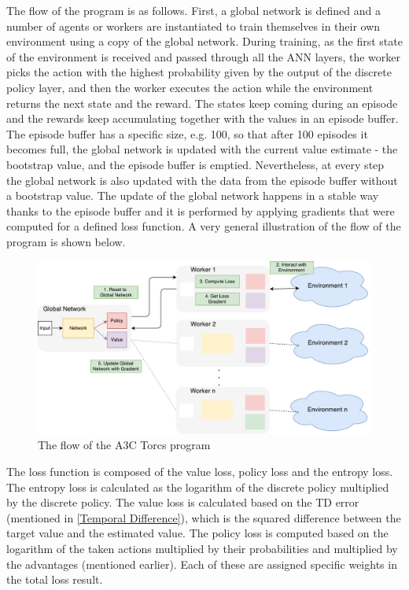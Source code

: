 The flow of the program is as follows. First, a global network is defined and a number of agents or workers are instantiated to train themselves in their own environment using a copy of the global network. During training, as the first state of the environment is received and passed through all the ANN layers, the worker picks the action with the highest probability given by the output of the discrete policy layer, and then the worker executes the action while the environment returns the next state and the reward. The states keep coming during an episode and the rewards keep accumulating together with the values in an episode buffer. The episode buffer has a specific size, e.g. 100, so that after 100 episodes it becomes full, the global network is updated with the current value estimate - the bootstrap value, and the episode buffer is emptied. Nevertheless, at every step the global network is also updated with the data from the episode buffer without a bootstrap value. The update of the global network happens in a stable way thanks to the episode buffer and it is performed by applying gradients that were computed for a defined loss function. A very general illustration of the flow of the program is shown below.
\begin{figure}[H]
	\centering
	\includegraphics[width=1.25\textwidth]{Figures/Flow}
	\caption{The flow of the A3C Torcs program}
	\label{Flow}
\end{figure}
The loss function is composed of the value loss, policy loss and the entropy loss. The entropy loss is calculated as the logarithm of the discrete policy multiplied by the discrete policy. The value loss is calculated based on the TD error (mentioned in \ref{Temporal Difference}), which is the squared difference between the target value and the estimated value. The policy loss is computed based on the logarithm of the taken actions multiplied by their probabilities and multiplied by the advantages (mentioned earlier). Each of these are assigned specific weights in the total loss result. 

